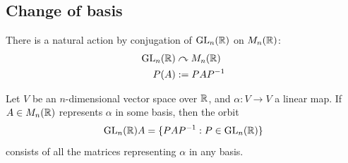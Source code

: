 \documentclass{../template/note}
\begin{document}
    \subsection{Change of basis}

    There is a natural action by conjugation of \(\operatorname{GL}_n(\mathbb R)\) on \(M_n(\mathbb R)\):
    \begin{align*}
        \operatorname{GL}_n(\mathbb R) &\curvearrowright M_n(\mathbb R) \\
        P(A) &:= PAP^{-1}
    \end{align*}
    
    \begin{proposition}
        Let \(V\) be an \(n\)-dimensional vector space over \(\mathbb R\), and \(\alpha: V \to V\) a linear map. If \(A \in M_n(\mathbb R)\) represents \(\alpha\) in some basis, then the orbit
        \[
            \operatorname{GL}_n(\mathbb R)A = \{PAP^{-1}: P \in \operatorname{GL}_n(\mathbb R)\}
        \]
        consists of all the matrices representing \(\alpha\) in any basis.
    \end{proposition}
    
\end{document}
